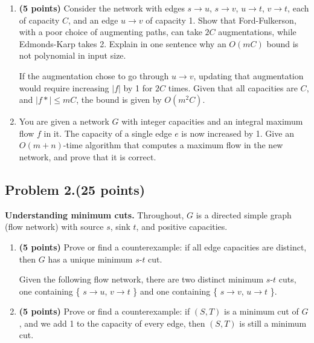 \documentclass[10pt,letterpaper]{article}
\begin{document}
\begin{enumerate}[label*=(\alph{enumi}), wide=0pt]
\begin{itemize}
\item $c \rightarrow t = 7$

\item $d \rightarrow t = 11$

\end{itemize}
The minimum cut disconnects $a \rightarrow c$ and $b \rightarrow d$, which has capacity of 13, matching the maximum flow. 
\color{black}

\item \textbf{(5 points)} Consider the network with edges $s \rightarrow u$, $s \rightarrow v$, $u \rightarrow t$, $v \rightarrow t$, each of capacity $C$, and an edge $u \rightarrow v$ of capacity 1. Show that Ford-Fulkerson, with a poor choice of augmenting paths, can take $2C$ augmentations, while Edmonds-Karp takes 2. Explain in one sentence why an $O(mC)$ bound is not polynomial in input size. 

\color{TangGreen}
If the augmentation chose to go through $u \rightarrow v$, updating that augmentation would require increasing $|f|$ by 1 for $2C$ times. Given that all capacities are $C$, and $|f*| \leq mC$, the bound is given by $O(m^{2}C)$. 
\color{black}

\item You are given a network $G$ with integer capacities and an integral maximum flow $f$ in it. The capacity of a single edge $e$ is now increased by 1. Give an $O(m + n)$-time algorithm that computes a maximum flow in the new network, and prove that it is correct.

\color{TangGreen}

\color{black}

\end{enumerate}

\subsection*{Problem 2.\hfill(25 points)}
\textbf{Understanding minimum cuts.} Throughout, $G$ is a directed simple graph (flow network) with source $s$, sink $t$, and positive capacities. 

\begin{enumerate}[label=(\alph{enumi}), wide=0pt]

\item \textbf{(5 points)} Prove or find a counterexample: if all edge capacities are distinct, then $G$ has a unique minimum $s$-$t$ cut. 

\color{TangGreen}
Given the following flow network, there are two distinct minimum $s$-$t$ cuts, one containing \{ $s \rightarrow u$, $v \rightarrow t$ \} and one containing \{ $s \rightarrow v$, $u \rightarrow t$ \}. 
\color{black}

\item \textbf{(5 points)} Prove or find a counterexample: if $(S, T)$ is a minimum cut of $G$, and we add 1 to the capacity of every edge, then $(S, T)$ is still a minimum cut. 

\end{enumerate}
\end{document}
